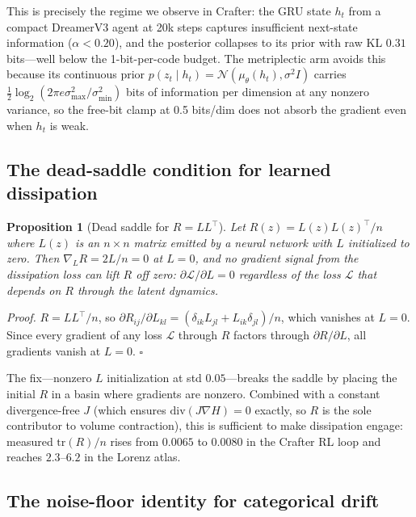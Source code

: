 \documentclass[preprint,12pt]{article}
\newtheorem{proposition}{Proposition}[section]
\begin{document}
This is precisely the regime we observe in Crafter: the GRU state $h_t$
from a compact DreamerV3 agent at 20k steps captures insufficient
next-state information ($\alpha < 0.20$), and the posterior collapses to
its prior with raw KL $0.31$ bits---well below the 1-bit-per-code budget.
The metriplectic arm avoids this because its continuous prior
$p(z_t \mid h_t) = \mathcal{N}(\mu_\theta(h_t), \sigma^2 I)$ carries
$\frac{1}{2}\log_2(2\pi e \sigma_{\max}^2/\sigma_{\min}^2)$ bits of
information per dimension at any nonzero variance, so the free-bit clamp
at 0.5 bits/dim does not absorb the gradient even when $h_t$ is weak.

\subsection{The dead-saddle condition for learned dissipation}

\begin{proposition}[Dead saddle for $R = LL^\top$]\label{prop:saddle}
Let $R(z) = L(z) L(z)^\top / n$ where $L(z)$ is an $n \times n$ matrix
emitted by a neural network with $L$ initialized to zero. Then
$\nabla_L R = 2 L / n = 0$ at $L = 0$, and no gradient signal from the
dissipation loss can lift $R$ off zero: $\partial \mathcal{L}/\partial L
= 0$ regardless of the loss $\mathcal{L}$ that depends on $R$ through
the latent dynamics.
\end{proposition}

\textit{Proof.} $R = LL^\top/n$, so
$\partial R_{ij}/\partial L_{kl} = (\delta_{ik} L_{jl} + L_{ik}
\delta_{jl})/n$, which vanishes at $L=0$. Since every gradient of any
loss $\mathcal{L}$ through $R$ factors through $\partial R / \partial L$,
all gradients vanish at $L=0$. $\square$

The fix---nonzero $L$ initialization at std $0.05$---breaks the saddle
by placing the initial $R$ in a basin where gradients are nonzero.
Combined with a constant divergence-free $J$ (which ensures $\mathrm{div}
(J \nabla H) = 0$ exactly, so $R$ is the sole contributor to volume
contraction), this is sufficient to make dissipation engage: measured
$\mathrm{tr}(R)/n$ rises from $0.0065$ to $0.0080$ in the Crafter RL
loop and reaches $2.3$--$6.2$ in the Lorenz atlas.

\subsection{The noise-floor identity for categorical drift}
\end{document}
